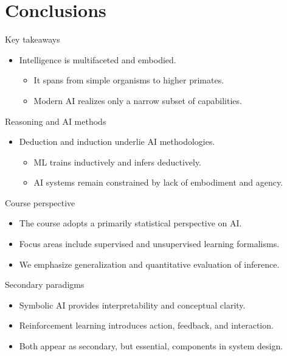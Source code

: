 \documentclass[12pt]{beamer}
\begin{document}
\section{Conclusions}

\begin{frame}{Key takeaways}
  \begin{itemize}
    \item Intelligence is multifaceted and embodied.
      \begin{itemize}
        \item It spans from simple organisms to higher primates.
        \item Modern AI realizes only a narrow subset of capabilities.
      \end{itemize}
  \end{itemize}
\end{frame}

\begin{frame}{Reasoning and AI methods}
  \begin{itemize}
    \item Deduction and induction underlie AI methodologies.
      \begin{itemize}
        \item ML trains inductively and infers deductively.
        \item AI systems remain constrained by lack of embodiment and agency.
      \end{itemize}
  \end{itemize}
\end{frame}

\begin{frame}{Course perspective}
  \begin{itemize}
    \item The course adopts a primarily statistical perspective on AI.
    \item Focus areas include supervised and unsupervised learning formalisms.
    \item We emphasize generalization and quantitative evaluation of inference.
  \end{itemize}
\end{frame}

\begin{frame}{Secondary paradigms}
  \begin{itemize}
    \item Symbolic AI provides interpretability and conceptual clarity.
    \item Reinforcement learning introduces action, feedback, and interaction.
    \item Both appear as secondary, but essential, components in system design.
  \end{itemize}
\end{frame}
\end{document}
